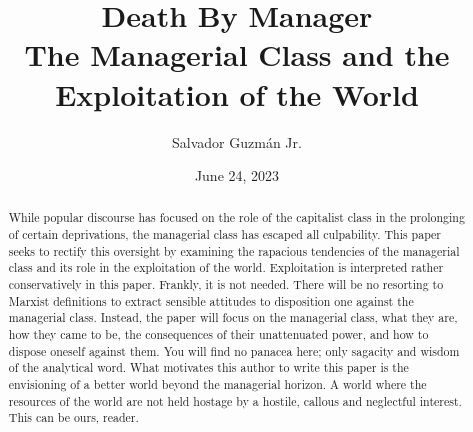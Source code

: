 \documentclass[12pt]{article}
\title{
 Death By Manager \\
 \large The Managerial Class and the Exploitation of the World}
\author{Salvador Guzm\'an Jr.}
\date{June 24, 2023}
\begin{document}
\maketitle
\pagebreak

\begin{abstract}
    While popular discourse has focused on the role of the capitalist class in the prolonging of certain deprivations, the managerial class has escaped all culpability.
    This paper seeks to rectify this oversight by examining the rapacious tendencies of the managerial class and its role in the exploitation of the world.
    Exploitation is interpreted rather conservatively in this paper.
    Frankly, it is not needed.
    There will be no resorting to Marxist definitions to extract sensible attitudes to disposition one against the managerial class. Instead, the paper will focus on the managerial class, what they are, how they came to be, the consequences of their unattenuated power, and how to dispose oneself against them.
    You will find no panacea here; only sagacity and wisdom of the analytical word. What motivates this author to write this paper is the envisioning of a better world beyond the managerial horizon.
    A world where the resources of the world are not held hostage by a hostile, callous and neglectful interest.
    This can be ours, reader.
\end{abstract}
\pagebreak
\tableofcontents
\pagebreak
\end{document}
